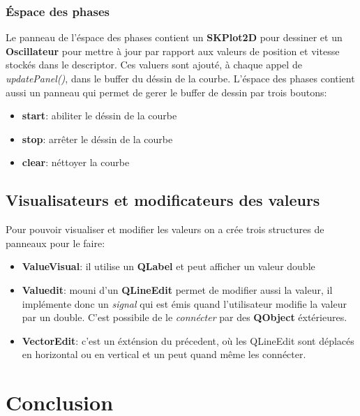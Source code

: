\documentclass{report}
\begin{document}
\subsection{Éspace des phases}

Le panneau de l'éspace des phases contient un \textbf{SKPlot2D} pour 
dessiner et un \textbf{Oscillateur} pour mettre à jour par rapport aux valeurs de 
position et vitesse stockés dans le descriptor.
Ces valuers sont ajouté, à chaque appel de \textit{updatePanel()}, dans le
buffer du déssin de la courbe.
L'éspace des phases contient aussi un panneau qui permet de gerer le buffer de
dessin par trois boutons:

\begin{itemize}
\item \textbf{start}: abiliter le déssin de la courbe
\item \textbf{stop}: arrêter le déssin de la courbe
\item \textbf{clear}: néttoyer la courbe
\end{itemize}

\section{Visualisateurs et modificateurs des valeurs}

Pour pouvoir visualiser et modifier les valeurs on a crée trois structures
de panneaux pour le faire:

\begin{itemize}
\item \textbf{ValueVisual}: il utilise un \textbf{QLabel} et peut afficher un
valeur double
\item \textbf{Valuedit}: mouni d'un \textbf{QLineEdit} permet de modifier aussi
la valeur, il implémente donc un \textit{signal} qui est émis quand
l'utilisateur modifie la valeur par un double. C'est possibile de le
\textit{connécter} par des \textbf{QObject} éxtérieures.
\item \textbf{VectorEdit}: c'est un éxténsion du précedent, où les QLineEdit
sont déplacés en horizontal ou en vertical et un peut quand même les connécter.
\end{itemize}

\chapter{Conclusion}
\end{document}
